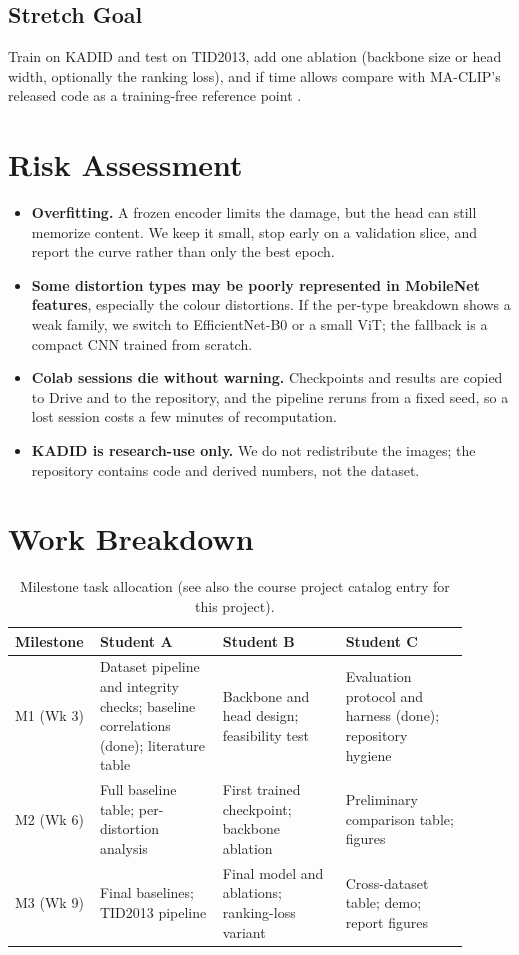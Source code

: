 \documentclass[11pt]{article}
\begin{document}
\subsection{Stretch Goal}
Train on KADID and test on TID2013, add one ablation (backbone size or head width,
optionally the ranking loss), and if time allows compare with MA-CLIP's released code as a
training-free reference point \citep{liao2026maclip}.

\section{Risk Assessment}
\label{sec:risk}
\begin{itemize}[leftmargin=*]
  \item \textbf{Overfitting.} A frozen encoder limits the damage, but the head can still
        memorize content. We keep it small, stop early on a validation slice, and report
        the curve rather than only the best epoch.
  \item \textbf{Some distortion types may be poorly represented in MobileNet features},
        especially the colour distortions. If the per-type breakdown shows a weak family,
        we switch to EfficientNet-B0 or a small ViT; the fallback is a compact CNN trained
        from scratch.
  \item \textbf{Colab sessions die without warning.} Checkpoints and results are copied to
        Drive and to the repository, and the pipeline reruns from a fixed seed, so a lost
        session costs a few minutes of recomputation.
  \item \textbf{KADID is research-use only.} We do not redistribute the images; the
        repository contains code and derived numbers, not the dataset.
\end{itemize}

\section{Work Breakdown}
\label{sec:workbreakdown}
\begin{table}[h]
\centering
\caption{Milestone task allocation (see also the course project catalog entry for this
project).}
\label{tab:tasks}
\begin{tabular}{@{}p{0.12\linewidth}p{0.26\linewidth}p{0.26\linewidth}p{0.26\linewidth}@{}}
\toprule
\textbf{Milestone} & \textbf{Student A} & \textbf{Student B} & \textbf{Student C} \\
\midrule
M1 (Wk 3) & Dataset pipeline and integrity checks; baseline correlations (done); literature table & Backbone and head design; feasibility test & Evaluation protocol and harness (done); repository hygiene \\
M2 (Wk 6) & Full baseline table; per-distortion analysis & First trained checkpoint; backbone ablation & Preliminary comparison table; figures \\
M3 (Wk 9) & Final baselines; TID2013 pipeline & Final model and ablations; ranking-loss variant & Cross-dataset table; demo; report figures \\
\bottomrule
\end{tabular}
\end{table}
\end{document}

